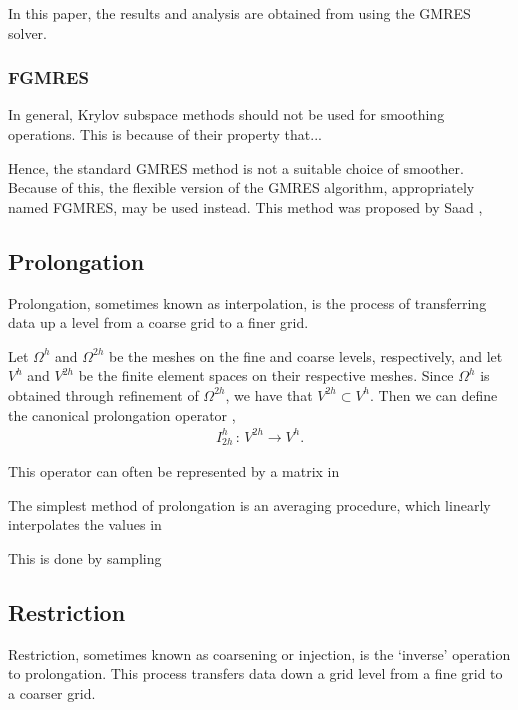 In this paper, the results and analysis are obtained from using the GMRES solver.


\subsubsection{FGMRES}

In general, Krylov subspace methods should not be used for smoothing operations.
This is because of their property that...

Hence, the standard GMRES method is not a suitable choice of smoother.
Because of this, the flexible version of the GMRES algorithm, appropriately named FGMRES, may be used instead.
This method was proposed by Saad \cite{fgmres}, 





\subsection{Prolongation}

Prolongation, sometimes known as interpolation, is the process of transferring data up a level from a coarse grid to a finer grid.

Let $\Omega^h$ and $\Omega^{2h}$ be the meshes on the fine and coarse levels, respectively, and let $V^{h}$ and $V^{2h}$ be the finite element spaces on their respective meshes.
Since $\Omega^{h}$ is obtained through refinement of $\Omega^{2h}$, we have that $V^{2h}\subset V^h$.
Then we can define the canonical prolongation operator \cite{volker},
\begin{align}
	I^h_{2h} \, : \, V^{2h} \rightarrow V^h.
\end{align}


This operator can often be represented by a matrix in 

The simplest method of prolongation is an averaging procedure, which linearly interpolates the values in

This is done by sampling




\subsection{Restriction}

Restriction, sometimes known as coarsening or injection, is the `inverse' operation to prolongation.
This process transfers data down a grid level from a fine grid to a coarser grid.

